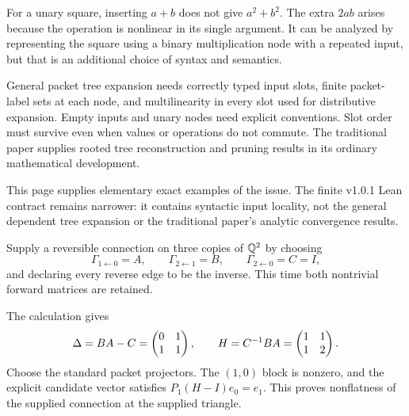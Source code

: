 
For a unary square, inserting $a+b$ does not give $a^2+b^2$. The extra $2ab$ arises because the operation is nonlinear in its single argument. It can be analyzed by representing the square using a binary multiplication node with a repeated input, but that is an additional choice of syntax and semantics.

General packet tree expansion needs correctly typed input slots, finite packet-label sets at each node, and multilinearity in every slot used for distributive expansion. Empty inputs and unary nodes need explicit conventions. Slot order must survive even when values or operations do not commute. The traditional paper supplies rooted tree reconstruction and pruning results in its ordinary mathematical development.

This page supplies elementary exact examples of the issue. The finite v1.0.1 Lean contract remains narrower: it contains syntactic input locality, not the general dependent tree expansion or the traditional paper's analytic convergence results.


Supply a reversible connection on three copies of $\mathbb Q^2$ by choosing
\[
\Gamma_{1\leftarrow0}=A,\qquad\Gamma_{2\leftarrow1}=B,
\qquad\Gamma_{2\leftarrow0}=C=I,
\]
and declaring every reverse edge to be the inverse. This time both nontrivial forward matrices are retained.


The calculation gives
\[
\Delta=BA-C=\begin{pmatrix}0&1\\1&1\end{pmatrix},\qquad H=C^{-1}BA=\begin{pmatrix}1&1\\1&2\end{pmatrix}.
\]
Choose the standard packet projectors. The $(1,0)$ block is nonzero, and the explicit candidate vector satisfies $P_1(H-I)e_0=e_1$. This proves nonflatness of the supplied connection at the supplied triangle.

